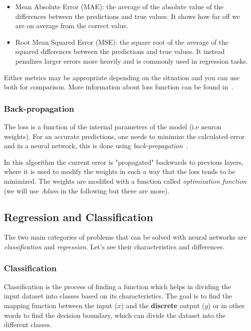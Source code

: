 \begin{itemize}
\tightlist
\item Mean Absolute Error (MAE): the average of the absolute value of the differences between the predictions and true values. It shows how far off we are on average from the correct value. 
\item Root Mean Squared Error (MSE): the square root of the average of the squared differences between the predictions and true values. It instead penalizes larger errors more heavily and is commonly used in regression tasks. 
\end{itemize}

Either metrics may be appropriate depending on the situation and you can use both for comparison. 
More information about loss function can be found in~\cite{bib:loss_function}.

\subsubsection{Back-propagation}
The loss is a function of the internal parameters of the model (i.e neuron weights). For an accurate predictions, one needs to minimize the calculated error and in a neural network, this is done using
\emph{back-propagation}~\cite{bib:backpropagation}.

In this algorithm the current error is "propagated" backwards to previous layers, where it is used to modify the weights in such a way that the loss tends to be minimized.
The weights are modified with a function called \emph{optimization function} (we will use \emph{Adam} in the following but there are more).

\subsection{Regression and Classification}
\label{regression-and-classification}

The two main categories of problems that can be solved with neural networks are \emph{classification} and \emph{regression}. Let's see their characteristics and differences.

\subsubsection{Classification}
\label{classification}

Classification is the process of finding a function which helps in dividing the input dataset into classes based on its characteristics. 
The goal is to find the mapping function between the input (\(x\)) and the \textbf{discrete} output (\(y\)) or in other words to find the decision boundary, which can divide the dataset into the different classes.

